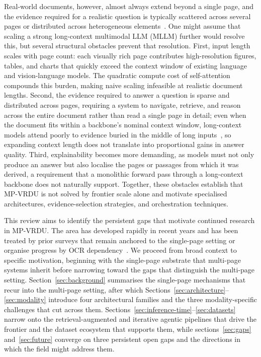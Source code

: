 \documentclass[11pt]{article}
\begin{document}
Real-world documents, however, almost always extend beyond a single page, and the evidence required for a realistic question is typically scattered across several pages or distributed across heterogeneous elements~\cite{tito2023hierarchical,blau2024gram}. One might assume that scaling a strong long-context multimodal LLM (MLLM) further would resolve this, but several structural obstacles prevent that resolution. First, input length scales with page count: each visually rich page contributes high-resolution figures, tables, and charts that quickly exceed the context window of existing language and vision-language models. The quadratic compute cost of self-attention~\cite{vaswani2017attention} compounds this burden, making naive scaling infeasible at realistic document lengths. Second, the evidence required to answer a question is sparse and distributed across pages, requiring a system to navigate, retrieve, and reason across the entire document rather than read a single page in detail; even when the document fits within a backbone's nominal context window, long-context models attend poorly to evidence buried in the middle of long inputs~\cite{liu2024lost}, so expanding context length does not translate into proportional gains in answer quality. Third, explainability becomes more demanding, as models must not only produce an answer but also localise the pages or passages from which it was derived, a requirement that a monolithic forward pass through a long-context backbone does not naturally support. Together, these obstacles establish that MP-VRDU is not solved by frontier scale alone and motivate specialised architectures, evidence-selection strategies, and orchestration techniques.

This review aims to identify the persistent gaps that motivate continued research in MP-VRDU. The area has developed rapidly in recent years and has been treated by prior surveys that remain anchored to the single-page setting or organise progress by OCR dependency~\cite{ding2025survey,gao2025scaling}. We proceed from broad context to specific motivation, beginning with the single-page substrate that multi-page systems inherit before narrowing toward the gaps that distinguish the multi-page setting. Section~\ref{sec:background} summarises the single-page mechanisms that recur into the multi-page setting, after which Sections~\ref{sec:architecture}--\ref{sec:modality} introduce four architectural families and the three modality-specific challenges that cut across them. Sections~\ref{sec:inference-time}--\ref{sec:datasets} narrow onto the retrieval-augmented and iterative agentic pipelines that drive the frontier and the dataset ecosystem that supports them, while sections~\ref{sec:gaps} and~\ref{sec:future} converge on three persistent open gaps and the directions in which the field might address them.
\end{document}
